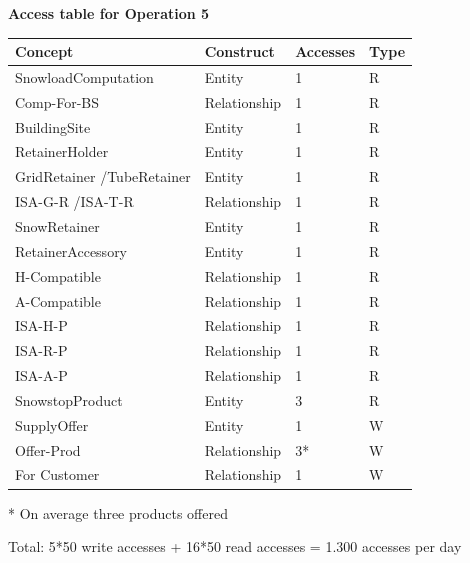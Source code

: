 \documentclass{article}[h]
\begin{document}
{\centering \textbf{Access table for Operation 5}\\}
\begin{table}[H]
  \def\arraystretch{1.10}%
  \centering
  \begin{tabular}{ | m{4cm} | m{4cm}| m{3cm} | m{2cm} |} 
    \hline
    {\textbf{\large Concept}} & {\textbf{\large Construct}} & {\textbf{\large Accesses}} & {\textbf{\large Type}} \\
    \hline
    \color[HTML]{3531FF} SnowloadComputation & Entity & 1 & R \\ 
    \hline
    \color[HTML]{3531FF} Comp-For-BS & Relationship & 1 & R \\ 
    \hline
    \color[HTML]{3531FF} BuildingSite & Entity & 1 & R \\ 
    \hline
    \color[HTML]{3531FF} RetainerHolder & Entity & 1 & R \\ 
    \hline
    \color[HTML]{3531FF} GridRetainer /\newline TubeRetainer & Entity & 1 & R \\ 
    \hline
    \color[HTML]{3531FF} ISA-G-R /\newline ISA-T-R & Relationship & 1 & R \\ 
    \hline
    \color[HTML]{3531FF} SnowRetainer & Entity & 1 & R \\ 
    \hline
    \color[HTML]{3531FF} RetainerAccessory & Entity & 1 & R \\ 
    \hline
    \color[HTML]{3531FF} H-Compatible & Relationship & 1 & R \\ 
    \hline
    \color[HTML]{3531FF} A-Compatible & Relationship & 1 & R \\ 
    \hline
    \color[HTML]{3531FF} ISA-H-P & Relationship & 1 & R \\ 
    \hline
    \color[HTML]{3531FF} ISA-R-P  & Relationship & 1 & R \\ 
    \hline
    \color[HTML]{3531FF} ISA-A-P  & Relationship & 1 & R \\ 
    \hline
    \color[HTML]{3531FF} SnowstopProduct & Entity & 3 & R \\ 
    \hline
    \color[HTML]{3531FF} SupplyOffer & Entity & 1 & W \\ 
    \hline
    \color[HTML]{3531FF} Offer-Prod & Relationship & 3* & W \\ 
    \hline
    \color[HTML]{3531FF} For Customer & Relationship & 1 & W \\ 
    \hline
  \end{tabular}
  \small{* On average three products offered}
\end{table}
Total: 5*50 write accesses + 16*50 read accesses = 1.300 accesses per day
\end{document}

